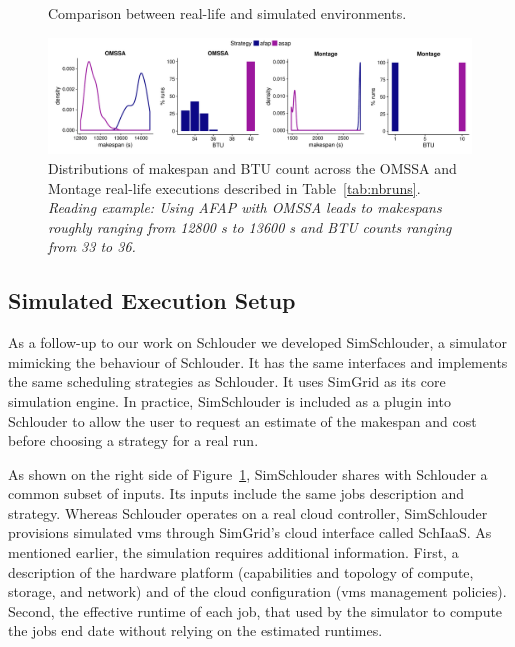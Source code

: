 \documentclass[10pt,conference,compsocconf]{IEEEtran}
\begin{document}
\begin{figure}
	\resizebox{0.5\textwidth}{!}{%
		
	}%
	\caption{Comparison between real-life and simulated environments.}\label{fig:rs}
\end{figure}
\begin{figure}
	\centering
	\includegraphics[width=\textwidth]{gfx/real_plot.pdf}
	\caption[caption]{Distributions of makespan and BTU count across the OMSSA and 
	  Montage real-life executions described in Table~\ref{tab:nbruns}.\\ 
	  \textit{Reading example: Using AFAP with OMSSA leads to makespans 
	  roughly ranging from 12800 s to 13600 s and BTU counts ranging from 33 to 36.}
	  }
	\label{fig:realbrs}
\end{figure}

\subsection{Simulated Execution Setup}
As a follow-up  to our work on Schlouder we  developed SimSchlouder, a simulator
mimicking  the  behaviour  of  Schlouder. It has the same interfaces and implements  the  same  scheduling
strategies  as  Schlouder. It  uses  SimGrid  as its  core  simulation  engine.  In
practice, SimSchlouder  is included as  a plugin  into Schlouder to allow the
user to request an estimate of the makespan and cost before choosing a
strategy for a real run.

As  shown on  the right  side of  Figure~\ref{fig:rs}, SimSchlouder  shares with
Schlouder  a common  subset of  inputs.   Its inputs  include the  same jobs
description  and  strategy.    Whereas  Schlouder  operates  on   a  real  cloud
controller,  SimSchlouder   provisions  simulated  \acp{vm} through
SimGrid's cloud interface  called SchIaaS. As mentioned  earlier, the simulation
requires  additional information. First, a description of the hardware platform 
(capabilities and topology of compute, storage, and network) and of the cloud configuration
(\acp{vm} management policies). Second, the effective runtime of each job, that
used by the simulator to compute the jobs end date without relying on the
estimated runtimes. 
\end{document}
